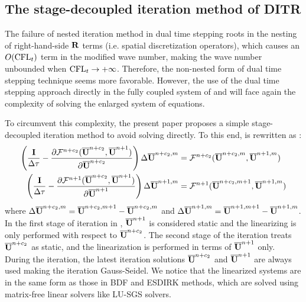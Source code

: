 \subsection{The stage-decoupled iteration method of DITR}

The failure of nested iteration method in dual time stepping
roots in the nesting of right-hand-side $\mathbf{R}$ terms
(i.e. spatial  discretization operators), which
causes an $O(\text{CFL}_t)$ term in the modified wave number,
making the wave number unbounded when $\text{CFL}_t\rightarrow + \infty$.
Therefore, the non-nested form of dual time stepping technique
seems more favorable. 
However, the use of the dual time stepping approach 
directly in the fully coupled system of 
 and  
will face again the complexity of 
solving the enlarged system of equations.

To circumvent this complexity, 
the present paper
proposes a simple stage-decoupled iteration method 
to avoid solving  directly.
To this end,  is rewritten as
:
\begin{equation}
    \begin{aligned}
        \left(\frac{\eye}{\inc\tau} -
        \partialderivative{\FF^{n+c_2}(\uu^{n+c_2}, \uu^{n+1})}{\uu^{n+c_2}}  \right)
        \inc\uu^{n+c_2,m} & = \FF^{n+c_2}(\uu^{n+c_2,m}, \uu^{n+1,m}) \\
        \left(\frac{\eye}{\inc\tau} -
        \partialderivative{\FF^{n+1}(\uu^{n+c_2}, \uu^{n+1})}{\uu^{n+1}}  \right)
        \inc\uu^{n+1,m}   & = \FF^{n+1}(\uu^{n+c_2,m+1}, \uu^{n+1,m}) \\
    \end{aligned}
    \label{eq:DITRSDS}
\end{equation}
where ${\Delta} \overline{\mathbf{U}}^{n+c_2,m} = \overline{\mathbf{U}}^{n+c_2,m+1} - \overline{\mathbf{U}}^{n+c_2,m}$ and
${\Delta} \overline{\mathbf{U}}^{n+1,m} = \overline{\mathbf{U}}^{n+1,m+1} - \overline{\mathbf{U}}^{n+1,m}$.
In the first stage of iteration in ,
$\overline{\mathbf{U}}^{n+1}$ is considered static and the linearizing is only
performed with respect to $\overline{\mathbf{U}}^{n+c_2}$. 
The second stage of the iteration treats  
$\overline{\mathbf{U}}^{n+c_2}$ as static, 
and the linearization is performed in terms of 
$\overline{\mathbf{U}}^{n+1}$ only. 
During the iteration, the latest iteration solutions 
$\overline{\mathbf{U}}^{n+c_2}$ and $\overline{\mathbf{U}}^{n+1}$ are always used 
making the iteration Gauss-Seidel.
We notice that the linearized systems are in the same form
as those in BDF and ESDIRK methods, 
which are solved using matrix-free linear solvers like
LU-SGS solvers.

